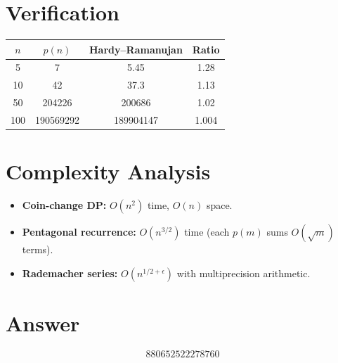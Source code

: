 \documentclass[11pt]{article}
\begin{document}
\section{Verification}

\begin{center}
\begin{tabular}{cccc}
\toprule
$n$ & $p(n)$ & Hardy--Ramanujan & Ratio \\
\midrule
5   & 7           & 5.45       & 1.28 \\
10  & 42          & 37.3       & 1.13 \\
50  & 204226      & 200686     & 1.02 \\
100 & 190569292   & 189904147  & 1.004 \\
\bottomrule
\end{tabular}
\end{center}

\section{Complexity Analysis}

\begin{itemize}
\item \textbf{Coin-change DP:} $O(n^2)$ time, $O(n)$ space.
\item \textbf{Pentagonal recurrence:} $O(n^{3/2})$ time (each $p(m)$ sums $O(\sqrt{m})$ terms).
\item \textbf{Rademacher series:} $O(n^{1/2+\epsilon})$ with multiprecision arithmetic.
\end{itemize}

\section{Answer}

\[
\boxed{880652522278760}
\]
\end{document}
